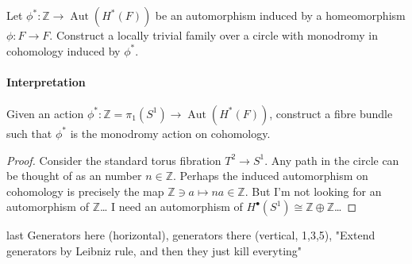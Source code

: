 \begin{manualexercise}{2.1}
	Let $ \phi^* :\mathbb{Z}\to \operatorname{Aut}(H^*(F))$ be an automorphism induced by a homeomorphism $\phi:F\to F$. Construct a locally trivial family over a circle with monodromy in cohomology induced by $\phi^*$. 
\end{manualexercise}

\paragraph{Interpretation} Given an action $\phi^*:\mathbb{Z}=\pi_{1}(S^1) \to \operatorname{Aut}(H^{*}(F))$, construct a fibre bundle such that $\phi^*$ is the monodromy action on cohomology.

\begin{proof}
	Consider the standard torus fibration $T^2\to S^1$. Any path in the circle can be thought of as an number $ n \in\mathbb{Z}$. Perhaps the induced automorphism on cohomology is precisely the map $\mathbb{Z}\ni a \mapsto na\in\mathbb{Z}$. But I'm not looking for an automorphism of $\mathbb{Z}$… I need an automorphism of $H^\bullet(S^1)\cong \mathbb{Z}\oplus \mathbb{Z}$…


\end{proof}

\begin{manualexercise}{last}
	Generators here (horizontal), generators there (vertical, 1,3,5), "Extend generators by Leibniz rule, and then they just kill everyting"
\end{manualexercise}


